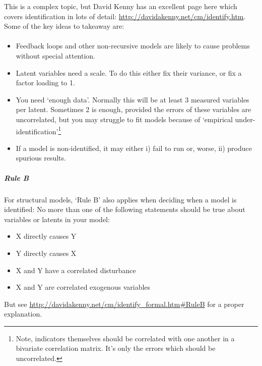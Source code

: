 \documentclass[]{article}
\providecommand{\tightlist}{%
  \setlength{\itemsep}{0pt}\setlength{\parskip}{0pt}}
\let\oldparagraph\paragraph
\renewcommand{\paragraph}[1]{\oldparagraph{#1}\mbox{}}
\let\oldsubparagraph\subparagraph
\renewcommand{\subparagraph}[1]{\oldsubparagraph{#1}\mbox{}}
\let\rmarkdownfootnote\footnote%
\def\footnote{\protect\rmarkdownfootnote}
\begin{document}
This is a complex topic, but David Kenny has an excellent page here which covers
identification in lots of detail: \url{http://davidakenny.net/cm/identify.htm}. Some
of the key ideas to takeaway are:

\hypertarget{identification-recursion}{%
\paragraph{}\label{identification-recursion}}

\begin{itemize}
\item
  Feedback loops and other non-recursive models are likely to cause problems
  without special attention.
\item
  Latent variables need a scale. To do this either fix their variance, or fix
  a factor loading to 1.
\item
  You need `enough data'. Normally this will be at least 3 measured variables
  per latent. Sometimes 2 is enough, provided the errors of these variables
  are uncorrelated, but you may struggle to fit models because of `empirical
  under-identification'\footnote{Note, indicators themselves should be correlated with
    one another in a bivariate correlation matrix. It's only the errors which
    should be uncorrelated.}
\item
  If a model is non-identified, it may either i) fail to run or, worse, ii)
  produce spurious results.
\end{itemize}

\hypertarget{rule-b}{%
\subparagraph{Rule B}\label{rule-b}}

For structural models, `Rule B' also applies when deciding when a model is
identified: No more than one of the following statements should be true about
variables or latents in your model:

\begin{itemize}
\tightlist
\item
  X directly causes Y
\item
  Y directly causes X
\item
  X and Y have a correlated disturbance
\item
  X and Y are correlated exogenous variables
\end{itemize}

But see \url{http://davidakenny.net/cm/identify_formal.htm\#RuleB} for a proper
explanation.
\end{document}

